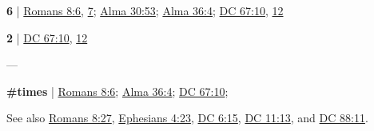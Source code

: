 	\begin{compactdesc}
	
		\item[carnal mind] \textbf{6} | \hyperref[ROMANS-8-6]{Romans 8:6}, \hyperref[ROMANS-8-7]{7}; \hyperref[ALMA-30-53]{Alma 30:53}; \hyperref[ALMA-36-4]{Alma 36:4}; \hyperref[DC67-10]{DC 67:10}, \hyperref[DC67-12]{12}
			\begin{compactdesc}
				\item[Bible anchor verses] \phantom{.}
					\begin{compactdesc}
						\item[{\hyperref[ROMANS-8-6]{Romans 8:6}}]
						\item[{\hyperref[ROMANS-8-7]{Romans 8:7}}]
					\end{compactdesc}
			\end{compactdesc}
			
		\item[natural mind] \textbf{2} | \hyperref[DC67-10]{DC 67:10}, \hyperref[DC67-12]{12}
			\begin{compactdesc}
				\item[Bible anchor verses] ---
			\end{compactdesc}
			
		\item[spiritual mind] \textbf{\#times} | \hyperref[ROMANS-8-6]{Romans 8:6}; \hyperref[ALMA-36-4]{Alma 36:4}; \hyperref[DC67-10]{DC 67:10}; 
			\begin{compactdesc}
				\item[Bible anchor verses] \phantom{.}
					\begin{compactdesc}
						\item[{\hyperref[ROMANS-8-6]{Romans 8:6}}]
					\end{compactdesc}
				\item[Commentary] See also \hyperref[ROMANS-8-27]{Romans 8:27}, \hyperref[EPHESIANS-4-23]{Ephesians 4:23}, \hyperref[DC6-15]{DC 6:15}, \hyperref[DC11-13]{DC 11:13}, and \hyperref[DC88-11]{DC 88:11}.
			\end{compactdesc}
			
			
	\end{compactdesc}
	
